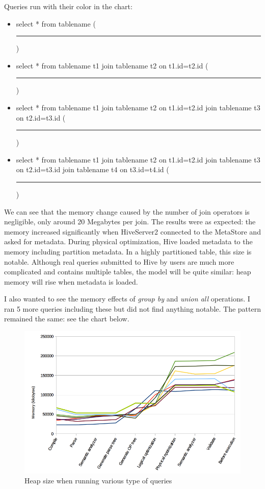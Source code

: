\noindent Queries run with their color in the chart:
\begin{itemize}
	\item select * from tablename (\textcolor{blue}{\rule{2 cm}{2pt} })
	\item select * from tablename t1 join tablename t2 on t1.id=t2.id (\textcolor{orange}{\rule{2 cm}{2pt} })
	\item select * from tablename t1 join tablename t2 on t1.id=t2.id join tablename t3 on t2.id=t3.id (\textcolor{yellow}{\rule{2 cm}{2pt} })
	\item select * from tablename t1 join tablename t2 on t1.id=t2.id join tablename t3 on t2.id=t3.id join tablename t4 on t3.id=t4.id (\textcolor{green}{\rule{2 cm}{2pt} })
\end{itemize}

We can see that the memory change caused by the number of join operators is negligible, only around 20 Megabytes per join. The results were as expected: the memory increased significantly when HiveServer2 connected to the MetaStore and asked for metadata. During physical optimization, Hive loaded metadata to the memory including partition metadata. In a highly partitioned table, this size is notable. Although real queries submitted to Hive by users are much more complicated and contains multiple tables, the model will be quite similar: heap memory will rise when metadata is loaded.

I also wanted to see the memory effects of \textit{group by} and  \textit{union all} operations. I ran 5 more queries including these but did not find anything notable. The pattern remained the same: see the chart below. 

\begin{figure}[H]
	\includegraphics[width=150mm, keepaspectratio]{figures/hs2_memory.png}
	\centering
	\caption{Heap size when running various type of queries}
\end{figure}

